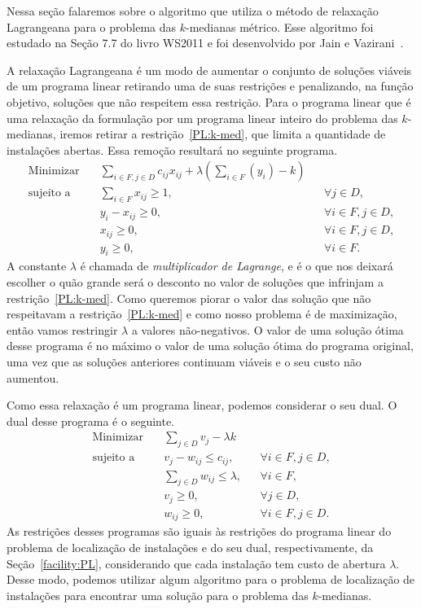 Nessa seção falaremos sobre o algoritmo que utiliza o método de relaxação Lagrangeana para o problema das $k$-medianas métrico. Esse algoritmo foi estudado na Seção 7.7 do livro WS2011 e foi desenvolvido por Jain e Vazirani~\cite{JV}.

A relaxação Lagrangeana é um modo de aumentar o conjunto de soluções viáveis de um programa linear retirando uma de suas restrições e penalizando, na função objetivo, soluções que não respeitem essa restrição. Para o programa linear que é uma relaxação da formulação por um programa linear inteiro do problema das $k$-medianas, iremos retirar a restrição~\eqref{PL:k-med}, que limita a quantidade de instalações abertas. Essa remoção resultará no seguinte programa.
\begin{align*}
    \text{Minimizar} \quad & \sum_{i \in F, j \in D} c_{ij}x_{ij} + \lambda \left(\sum_{i \in F} (y_i) - k\right)\label{RL} \tag{RL} \\
    \text{sujeito a} \quad & \sum_{i \in F} x_{ij} \geq 1, &&\forall j \in D, \\
                           & y_i - x_{ij} \geq 0, &&\forall i \in F, j \in D, \\
                           & x_{ij} \geq 0, && \forall i \in F,j \in D, \\
                           & y_i \geq 0, &&\forall i \in F.
\end{align*}
A constante $\lambda$ é chamada de \emph{multiplicador de Lagrange}, e é o que nos deixará escolher o quão grande será o desconto no valor de soluções que infrinjam a restrição~\eqref{PL:k-med}.
Como queremos piorar o valor das solução que não respeitavam a restrição~\eqref{PL:k-med} e como nosso problema é de maximização, então vamos restringir $\lambda$ a valores não-negativos.
O valor de uma solução ótima desse programa é no máximo o valor de uma solução ótima do programa original, uma vez que as soluções anteriores continuam viáveis e o seu custo não aumentou.

Como essa relaxação é um programa linear, podemos considerar o seu dual. O dual desse programa é o seguinte.
\begin{align*}
    \text{Minimizar} \quad & \sum_{j \in D} v_j - \lambda k \label{DL} \tag{DL}\\
    \text{sujeito a} \quad & v_j - w_{ij} \leq c_{ij}, &&\forall i \in F, j\in D, \\
                           & \sum_{j\in D} w_{ij} \leq \lambda, &&\forall i \in F, \\
                           & v_j \geq 0, &&\forall j\in D, \\
                           & w_{ij} \geq 0, && \forall i \in F,j \in D.
\end{align*}
As restrições desses programas são iguais às restrições do programa linear do problema de localização de instalações e do seu dual, respectivamente, da Seção~\eqref{facility:PL}, considerando que cada instalação tem custo de abertura $\lambda$.
Desse modo, podemos utilizar algum algoritmo para o problema de localização de instalações para encontrar uma solução para o problema das $k$-medianas. 

